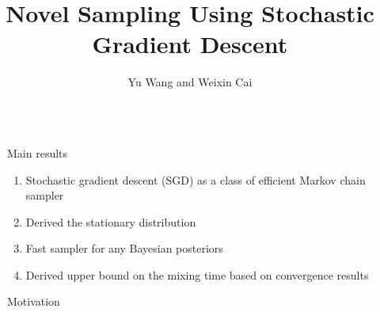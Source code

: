 \documentclass[final]{beamer}
\title{Novel Sampling Using Stochastic Gradient Descent} %
\author{Yu Wang and Weixin Cai} %
\institute{Department of Statistics, UC Berkeley} %
\newlength{\sepwid}
\newlength{\onecolwid}
\begin{document}

\setlength{\belowcaptionskip}{2ex} %
\setlength\belowdisplayshortskip{2ex} %

\begin{frame}[t] %

\begin{columns}[t] %

\begin{column}{\sepwid}\end{column} %

\begin{column}{\onecolwid} %


\begin{alertblock}{Main results}


\begin{enumerate}
\item Stochastic gradient descent (SGD) as a class of efficient Markov chain sampler
\item Derived the stationary distribution
\item Fast sampler for any Bayesian posteriors
\item Derived upper bound on the mixing time based on convergence results
\end{enumerate}

\end{alertblock}


\begin{block}{Motivation}


\end{block}
\end{column}
\end{columns}
\end{frame}
\end{document}
